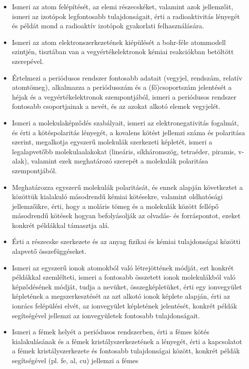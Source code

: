 \begin{itemize}
\item
  Ismeri az atom felépítését, az elemi részecskéket, valamint azok
  jellemzőit, ismeri az izotópok legfontosabb tulajdonságait, érti a
  radioaktivitás lényegét és példát mond a radioaktív izotópok
  gyakorlati felhasználására.
\item
  Ismeri az atom elektronszerkezetének kiépülését a bohr-féle atommodell
  szintjén, tisztában van a vegyértékelektronok kémiai reakciókban
  betöltött szerepével.
\item
  Értelmezi a periódusos rendszer fontosabb adatait (vegyjel, rendszám,
  relatív atomtömeg), alkalmazza a periódusszám és a (fő)csoportszám
  jelentését a héjak és a vegyértékelektronok szempontjából, ismeri a
  periódusos rendszer fontosabb csoportjainak a nevét, és az azokat
  alkotó elemek vegyjelét.
\item
  Ismeri a molekulaképződés szabályait, ismeri az elektronegativitás
  fogalmát, és érti a kötéspolaritás lényegét, a kovalens kötést
  jellemzi száma és polaritása szerint, megalkotja egyszerű molekulák
  szerkezeti képletét, ismeri a legalapvetőbb molekulaalakokat
  (lineáris, síkháromszög, tetraéder, piramis, v-alak), valamint ezek
  meghatározó szerepét a molekulák polaritása szempontjából.
\item
  Meghatározza egyszerű molekulák polaritását, és ennek alapján
  következtet a közöttük kialakuló másodrendű kémiai kötésekre, valamint
  oldhatósági jellemzőikre, érti, hogy a moláris tömeg és a molekulák
  között fellépő másodrendű kötések hogyan befolyásolják az olvadás- és
  forráspontot, ezeket konkrét példákkal támasztja alá.
\item
  Érti a részecske szerkezete és az anyag fizikai és kémiai
  tulajdonságai közötti alapvető összefüggéseket.
\item
  Ismeri az egyszerű ionok atomokból való létrejöttének módját, ezt
  konkrét példákkal szemlélteti, ismeri a fontosabb összetett ionok
  molekulákból való képződésének módját, tudja a nevüket,
  összegképletüket, érti egy ionvegyület képletének a megszerkesztését
  az azt alkotó ionok képlete alapján, érti az ionrács felépülési elvét,
  az ionvegyület képletének jelentését, konkrét példák segítségével
  jellemzi az ionvegyületek fontosabb tulajdonságait.
\item
  Ismeri a fémek helyét a periódusos rendszerben, érti a fémes kötés
  kialakulásának és a fémek kristályszerkezetének a lényegét, érti a
  kapcsolatot a fémek kristályszerkezete és fontosabb tulajdonságai
  között, konkrét példák segítségével (pl. fe, al, cu) jellemzi a fémes

\end{itemize}
